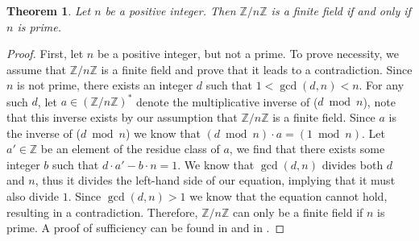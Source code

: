 \documentclass[openany, a4paper, 10pt]{book}
\theoremstyle{plain}
\newtheorem{theorem}{Theorem}[chapter]
\theoremstyle{plain}
\theoremstyle{plain}
\theoremstyle{definition}
\theoremstyle{plain}
\theoremstyle{definition}
\theoremstyle{remark}
\begin{document}
\begin{theorem}\label{prime_field}
    Let $n$ be a positive integer. Then $\mathbb Z / n \mathbb Z$ is a finite field if and only if $n$ is prime.
\end{theorem}
\begin{proof}
    First, let $n$ be a positive integer, but not a prime.
    To prove necessity, we assume that $\mathbb Z/n\mathbb Z$ is a finite field and prove that it leads to a contradiction.
    Since $n$ is not prime, there exists an integer $d$ such that $1 < \gcd(d, n) < n$.
    For any such $d$, let $a \in (\mathbb Z/n\mathbb Z)^*$ denote the multiplicative inverse of ($d \bmod n$), note that this inverse exists by our assumption that $\mathbb Z/n\mathbb Z$ is a finite field.
    Since $a$ is the inverse of ($d \bmod n$) we know that $(d \bmod n) \cdot a = (1 \bmod n)$.
    Let $a' \in \mathbb Z$ be an element of the residue class of $a$, we find that there exists some integer $b$ such that $d\cdot a' - b\cdot n = 1$.
    We know that $\gcd(d, n)$ divides both $d$ and $n$, thus it divides the left-hand side of our equation, implying that it must also divide $1$.
    Since $\gcd(d, n) > 1$ we know that the equation cannot hold, resulting in a contradiction.
    Therefore, $\mathbb Z/n\mathbb Z$ can only be a finite field if $n$ is prime.
    A proof of sufficiency can be found in \cite[Theorem~3]{MIT_finite_fields} and in \cite[Theorem~7.5]{Forney_finite_fields}.
\end{proof}
\end{document}
